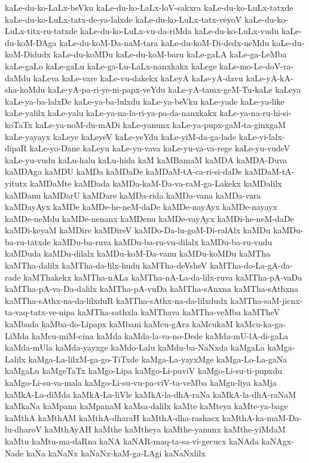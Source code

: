 {kaLe-du-ko-LaLx-beVku
kaLe-du-ko-LaLx-loV-sakxra
kaLe-du-ko-LuLx-tatxde
kaLe-du-ko-LuLx-tatx-de-ya-lalxde
kaLe-du-ko-LuLx-tatx-veyoV
kaLe-du-ko-LuLx-titx-ru-tatxde
kaLe-du-ko-LuLx-vu-da-riMda
kaLe-du-ko-LuLx-vudu
kaLe-du-koM-DAga
kaLe-du-koM-Da-naM-tara
kaLe-du-koM-Di-dedx-neMdu
kaLe-du-koM-Didudx
kaLe-du-koMDu
kaLe-du-koM-baru
kaLe-gaLA
kaLe-ga-LeMba
kaLe-gaLo
kaLe-gaLu
kaLe-ga-Lu-LaLx-nanxkakx
kaLege
kaLe-mo-Le-doV-ra-daMdu
kaLeva
kaLe-vare
kaLe-vu-dakekx
kaLeyA
kaLe-yA-davu
kaLe-yA-kA-sha-koMdu
kaLe-yA-pa-ri-ye-ni-papx-veYdu
kaLe-yA-tamx-geM-Tu-kaLe
kaLeya
kaLe-ya-ba-lalxDe
kaLe-ya-ba-lulxdu
kaLe-ya-beVku
kaLe-yade
kaLe-ya-like
kaLe-yalilx
kaLe-yalu
kaLe-ya-na-la-ri-ya-pa-da-nanxkakx
kaLe-ya-na-ru-hi-si-koTaTx
kaLe-ya-noM-du-mADi
kaLe-yanunx
kaLe-ya-pupx-gaM-ta-ginxgaM
kaLe-yayayx
kaLeye
kaLeyeV
kaLe-yeYdu
kaLe-yiM-da-ga-lade
kaLe-yi-lalx-dipaR
kaLe-yo-Dane
kaLeyu
kaLe-yu-vava
kaLe-yu-va-va-rege
kaLe-yu-vudeV
kaLe-yu-vudu
kaLu-halu
kaLu-hida
kaM
kaMBamaM
kaMDA
kaMDA-Duva
kaMDAga
kaMDU
kaMDa
kaMDaDe
kaMDaM-tA-ca-ri-si-daDe
kaMDaM-tA-yitutx
kaMDaMte
kaMDada
kaMDa-kaM-Da-va-raM-ga-Lakekx
kaMDalilx
kaMDanu
kaMDarU
kaMDare
kaMDa-rida
kaMDa-vana
kaMDa-vara
kaMDayAyx
kaMDe
kaMDe-he-neM-daDe
kaMDe-nayAyx
kaMDe-nayayx
kaMDe-neMdu
kaMDe-nenanx
kaMDenu
kaMDe-vayAyx
kaMDi-he-neM-daDe
kaMDi-keyaM
kaMDire
kaMDireV
kaMDo-Da-lu-goM-Di-ralAlx
kaMDu
kaMDu-ba-ru-tatxde
kaMDu-ba-ruva
kaMDu-ba-ru-vu-dilalx
kaMDu-ba-ru-vudu
kaMDuda
kaMDu-dilalx
kaMDu-koM-Da-vanu
kaMDu-koMDu
kaMTha
kaMTha-dalilx
kaMTha-da-lilx-hudu
kaMTha-deVsheV
kaMTha-do-La-gA-da-rade
kaMThakekx
kaMTha-nALa
kaMTha-nA-La-da-lilx-ruva
kaMTha-pA-vaDa
kaMTha-pA-va-Da-dalilx
kaMTha-pA-vuDa
kaMTha-sAnxna
kaMTha-sAthxna
kaMTha-sAthx-na-da-lilxduR
kaMTha-sAthx-na-da-lilxdudx
kaMTha-saM-jicnx-ta-vaq-tatx-ve-nipa
kaMTha-sathxla
kaMThava
kaMTha-veMba
kaMTheV
kaMbada
kaMba-do-Lipapx
kaMbani
kaMcu-gAra
kaMcukaM
kaMcu-ka-ga-LiMda
kaMcu-miM-cina
kaMda
kaMda-la-va-no-Dede
kaMda-mU-lA-di-gaLa
kaMda-mUla
kaMda-yayxge
kaMdo-Lalu
kaMdu-ba-NaNxda
kaMgaLa
kaMga-Lalilx
kaMga-La-lilxM-ga-go-TiTxde
kaMga-La-yayxMge
kaMga-Lo-La-gaNa
kaMgaLu
kaMgeTaTx
kaMgo-Lipa
kaMgo-Li-puviV
kaMgo-Li-su-ti-pupxdu
kaMgo-Li-su-va-mala
kaMgo-Li-su-vu-pa-viV-ta-veMba
kaMgu-liya
kaMja
kaMkA-La-diMda
kaMkA-La-liVle
kaMkA-la-dhA-raNa
kaMkA-la-dhA-raNaM
kaMkaNa
kaMpana
kaMpanaM
kaMsa-dalilx
kaMte
kaMteya
kaMte-ya-bage
kaMthA
kaMthAM
kaMthA-dharaH
kaMthA-dha-rashacx
kaMthA-ka-maM-Da-lu-dharoV
kaMthAyAH
kaMthe
kaMtheya
kaMthe-yanunx
kaMthe-yiMdaM
kaMtu
kaMtu-ma-daRna
kaNA
kaNAR-maq-ta-sa-vi-gecucx
kaNAda
kaNAgx-Nade
kaNa
kaNaNx
kaNaNx-kaM-ga-LAgi
kaNaNxlilx
}
